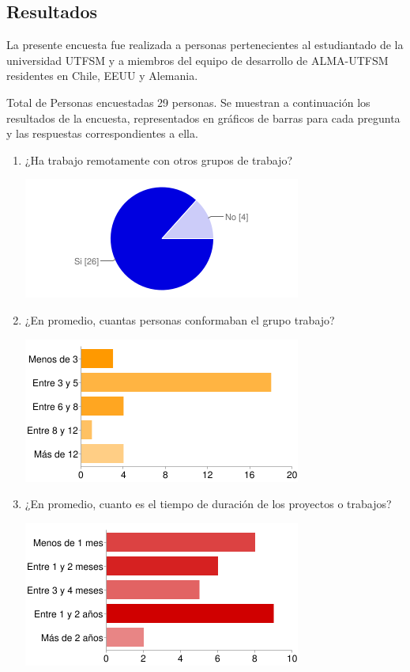 \subsection{Resultados}
La presente encuesta fue realizada a personas pertenecientes al estudiantado
de la universidad UTFSM y a miembros del equipo de desarrollo de ALMA-UTFSM
residentes en Chile, EEUU y Alemania.

Total de Personas encuestadas 29 personas.
Se muestran a continuación los resultados de la encuesta, representados en
gráficos de barras para cada pregunta y las respuestas correspondientes a
ella.

\begin{enumerate}
    \item ¿Ha trabajo remotamente con otros grupos de trabajo?\\
    \begin{center}
	\includegraphics[scale=0.7]{images/fig1}
    \end{center}
    \item ¿En promedio, cuantas personas conformaban el grupo trabajo?\\
    \begin{center}
	\includegraphics[scale=0.7]{images/fig2}
    \end{center}
    \item ¿En promedio, cuanto es el tiempo de duración de los
    proyectos o trabajos?\\
    \begin{center}
	\includegraphics[scale=0.7]{images/fig3}

\end{center}
\end{enumerate}
